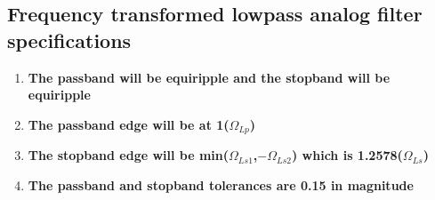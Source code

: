 \documentclass[12pt]{article}
\begin{document}
\subsection{Frequency transformed lowpass analog filter specifications}
\begin{enumerate}
    \item \textbf{The passband will be equiripple and the stopband will be equiripple}
    \item \textbf{The passband edge will be at 1($\Omega_{Lp}$)}
    \item \textbf{The stopband edge will be min($\Omega_{Ls1}$,$-\Omega_{Ls2}$) which is 1.2578($\Omega_{Ls}$)}
    \item \textbf{The passband and stopband tolerances are 0.15 in magnitude}

\end{enumerate}
\end{document}
